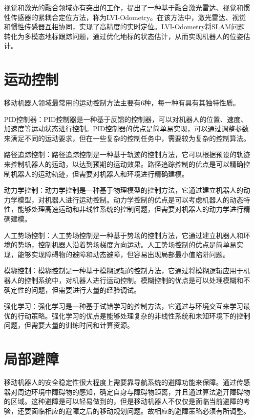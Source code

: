 视觉和激光的融合领域亦有突出的工作，\citet{wisth2021unified}提出了一种基于融合激光雷达、视觉和惯性传感器的紧耦合定位方法，称为LVI-Odometry。在该方法中，激光雷达、视觉和惯性传感器互相协同，实现了高精度的实时定位。LVI-Odometry将SLAM问题转化为多模态地标跟踪问题，通过优化地标的状态估计，从而实现机器人的位姿估计。


\section{运动控制}
移动机器人领域最常用的运动控制方法主要有6种，每一种有具有其独特性质。

PID控制器：PID控制器是一种基于反馈的控制器，可以对机器人的位置、速度、加速度等运动状态进行控制。PID控制器的优点是简单易实现，可以通过调整参数来满足不同的运动要求，但在一些复杂的控制任务中，需要较为复杂的控制算法。

路径追踪控制：路径追踪控制是一种基于轨迹的控制方法，它可以根据预设的轨迹来控制机器人的运动，以达到预期的运动效果。路径追踪控制的优点是可以精确控制机器人的运动轨迹，但需要对机器人和环境进行精确建模。

动力学控制：动力学控制是一种基于物理模型的控制方法，它通过建立机器人的动力学模型，对机器人进行运动控制。动力学控制的优点是可以考虑机器人的动态特性，能够处理高速运动和非线性系统的控制问题，但需要对机器人的动力学进行精确建模。

人工势场控制：人工势场控制是一种基于势场的控制方法，它通过建立机器人和环境的势场，控制机器人沿着势场梯度方向运动。人工势场控制的优点是简单易实现，能够实现障碍物的避障和动态避障，但容易出现局部最小值陷阱问题。

模糊控制：模糊控制是一种基于模糊逻辑的控制方法，它通过将模糊逻辑应用于机器人的控制系统中，对机器人进行运动控制。模糊控制的优点是可以处理模糊和不确定性的问题，但需要进行大量的经验调试。

强化学习：强化学习是一种基于试错学习的控制方法，它通过与环境交互来学习最优的行动策略。强化学习的优点是能够处理复杂的非线性系统和未知环境下的控制问题，但需要大量的训练时间和计算资源。

\section{局部避障}
移动机器人的安全稳定性很大程度上需要靠导航系统的避障功能来保障。通过传感器对周边环境中障碍物的感知，确定自身与障碍物距离，并且通过算法避开障碍物的区域。这种避障是可以轻易做到的，但是移动机器人不仅仅是面临当前避障的考验，还要面临相应的避障之后的移动规划问题。故相应的避障策略必须有所调整。

